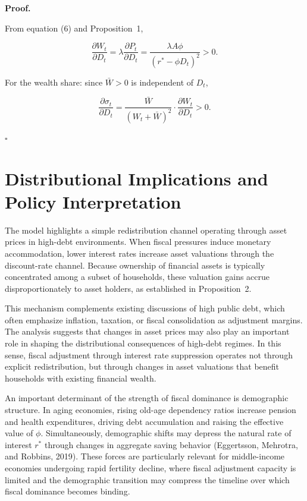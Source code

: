 \documentclass[3p]{elsarticle}
\begin{document}
\textbf{Proof.}

From equation (6) and Proposition~1,

\[
\frac{\partial W_t}{\partial D_t}
= \lambda \frac{\partial P_t}{\partial D_t}
= \frac{\lambda A\phi}{(r^{*}-\phi D_t)^2} > 0.
\]

For the wealth share: since $\bar{W}>0$ is independent of $D_t$,

\[
\frac{\partial \sigma_t}{\partial D_t}
=
\frac{\bar{W}}{(W_t+\bar{W})^2}
\cdot
\frac{\partial W_t}{\partial D_t}
> 0.
\]

\hfill $\square$

\section{Distributional Implications and Policy Interpretation}

The model highlights a simple redistribution channel operating through asset prices in
high-debt environments. When fiscal pressures induce monetary accommodation, lower
interest rates increase asset valuations through the discount-rate channel. Because
ownership of financial assets is typically concentrated among a subset of households,
these valuation gains accrue disproportionately to asset holders, as established in
Proposition~2.

This mechanism complements existing discussions of high public debt, which often emphasize
inflation, taxation, or fiscal consolidation as adjustment margins. The analysis suggests
that changes in asset prices may also play an important role in shaping the distributional
consequences of high-debt regimes. In this sense, fiscal adjustment through interest rate
suppression operates not through explicit redistribution, but through changes in asset
valuations that benefit households with existing financial wealth.

An important determinant of the strength of fiscal dominance is demographic structure.
In aging economies, rising old-age dependency ratios increase pension and health
expenditures, driving debt accumulation and raising the effective value of $\phi$.
Simultaneously, demographic shifts may depress the natural rate of interest $r^{*}$
through changes in aggregate saving behavior (Eggertsson, Mehrotra, and Robbins, 2019).
These forces are particularly relevant for middle-income economies undergoing rapid
fertility decline, where fiscal adjustment capacity is limited and the demographic
transition may compress the timeline over which fiscal dominance becomes binding.
\end{document}
